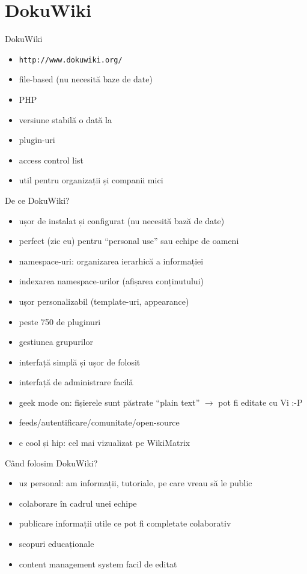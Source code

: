 \documentclass{beamer}
\begin{document}
\section{DokuWiki}

\begin{frame}{DokuWiki}
  \begin{itemize}
    \item \texttt{http://www.dokuwiki.org/}
    \item file-based (nu necesită baze de date)
    \item PHP
    \item versiune stabilă o dată la 
    \item plugin-uri
    \item access control list
    \item util pentru organizații și companii mici
  \end{itemize}
\end{frame}

\begin{frame}{De ce DokuWiki?}
  \begin{itemize}
    \item ușor de instalat și configurat (nu necesită bază de date)
    \item perfect (zic eu) pentru ``personal use'' sau echipe de oameni
    \item namespace-uri: organizarea ierarhică a informației
    \item indexarea namespace-urilor (afișarea conținutului)
    \item ușor personalizabil (template-uri, appearance)
    \item peste 750 de pluginuri
    \item gestiunea grupurilor
    \item interfață simplă și ușor de folosit
    \item interfață de administrare facilă
    \item geek mode on: fișierele sunt păstrate ``plain text'' $\rightarrow$ pot
    fi editate cu Vi :-P
    \item feeds/autentificare/comunitate/open-source
    \item e cool și hip: cel mai vizualizat pe WikiMatrix
  \end{itemize}
\end{frame}

\begin{frame}{Când folosim DokuWiki?}
  \begin{itemize}
    \item uz personal: am informații, tutoriale, pe care vreau să le public
    \item colaborare în cadrul unei echipe
    \item publicare informații utile ce pot fi completate colaborativ
    \item scopuri educaționale
    \item content management system facil de editat
  \end{itemize}
\end{frame}
\end{document}
